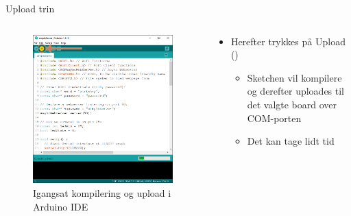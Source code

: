 \documentclass[aspectratio=169]{beamer}
\begin{document}
\begin{frame}{Upload trin}
\begin{columns}

	\begin{column}{0.5\textwidth}
		\begin{figure}
  			\includegraphics[height=0.6\textheight,keepaspectratio=true]{assets/pictures/compilingsketch.png}
  			\caption{Igangsat kompilering og upload i Arduino IDE}
  			\label{fig:compilingsketch}
		\end{figure}
	\end{column}

	\begin{column}{0.5\textwidth}
		\begin{textBox}
			\begin{itemize}
				\item Herefter trykkes på Upload ()
				\begin{itemize}
					\item Sketchen vil kompilere og derefter uploades til det valgte board over COM-porten
					\item Det kan tage lidt tid
				\end{itemize}
			\end{itemize}
		\end{textBox}
	\end{column}
	
\end{columns}
\end{frame}
\end{document}
